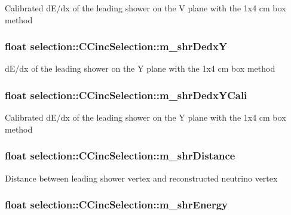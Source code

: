 Calibrated d\-E/dx of the leading shower on the V plane with the 1x4 cm box method \hypertarget{classselection_1_1CCincSelection_aca70f9a6dfad2d0ed4c2ef4c71fe37bd}{
\subsubsection[{m\-\_\-shr\-Dedx\-Y}]{\setlength{\rightskip}{0pt plus 5cm}float selection\-::\-C\-Cinc\-Selection\-::m\-\_\-shr\-Dedx\-Y\hspace{0.3cm}{\ttfamily [private]}}}\label{classselection_1_1CCincSelection_aca70f9a6dfad2d0ed4c2ef4c71fe37bd}
d\-E/dx of the leading shower on the Y plane with the 1x4 cm box method \hypertarget{classselection_1_1CCincSelection_a1b1d664e4bcff3d9e4d10596ca5039d2}{
\subsubsection[{m\-\_\-shr\-Dedx\-Y\-Cali}]{\setlength{\rightskip}{0pt plus 5cm}float selection\-::\-C\-Cinc\-Selection\-::m\-\_\-shr\-Dedx\-Y\-Cali\hspace{0.3cm}{\ttfamily [private]}}}\label{classselection_1_1CCincSelection_a1b1d664e4bcff3d9e4d10596ca5039d2}
Calibrated d\-E/dx of the leading shower on the Y plane with the 1x4 cm box method \hypertarget{classselection_1_1CCincSelection_ae496cb17c72b3ed96b13484a1ff9e3fb}{
\subsubsection[{m\-\_\-shr\-Distance}]{\setlength{\rightskip}{0pt plus 5cm}float selection\-::\-C\-Cinc\-Selection\-::m\-\_\-shr\-Distance\hspace{0.3cm}{\ttfamily [private]}}}\label{classselection_1_1CCincSelection_ae496cb17c72b3ed96b13484a1ff9e3fb}
Distance between leading shower vertex and reconstructed neutrino vertex \hypertarget{classselection_1_1CCincSelection_a2650ff351a7a6589c2b6ff9f701da321}{
\subsubsection[{m\-\_\-shr\-Energy}]{\setlength{\rightskip}{0pt plus 5cm}float selection\-::\-C\-Cinc\-Selection\-::m\-\_\-shr\-Energy\hspace{0.3cm}{\ttfamily [private]}}}\label{classselection_1_1CCincSelection_a2650ff351a7a6589c2b6ff9f701da321}
